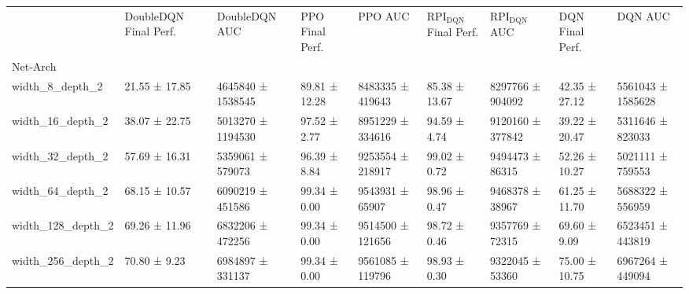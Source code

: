 \begin{tabular}{lllllllll}
\toprule
 & DoubleDQN Final Perf. & DoubleDQN AUC & PPO Final Perf. & PPO AUC & RPI$_{\mathrm{DQN}}$ Final Perf. & RPI$_{\mathrm{DQN}}$ AUC & DQN Final Perf. & DQN AUC \\
Net-Arch &  &  &  &  &  &  &  &  \\
\midrule
width_8_depth_2 & 21.55 ± 17.85 & 4645840 ± 1538545 & 89.81 ± 12.28 & 8483335 ± 419643 & 85.38 ± 13.67 & 8297766 ± 904092 & 42.35 ± 27.12 & 5561043 ± 1585628 \\
width_16_depth_2 & 38.07 ± 22.75 & 5013270 ± 1194530 & 97.52 ± 2.77 & 8951229 ± 334616 & 94.59 ± 4.74 & 9120160 ± 377842 & 39.22 ± 20.47 & 5311646 ± 823033 \\
width_32_depth_2 & 57.69 ± 16.31 & 5359061 ± 579073 & 96.39 ± 8.84 & 9253554 ± 218917 & 99.02 ± 0.72 & 9494473 ± 86315 & 52.26 ± 10.27 & 5021111 ± 759553 \\
width_64_depth_2 & 68.15 ± 10.57 & 6090219 ± 451586 & 99.34 ± 0.00 & 9543931 ± 65907 & 98.96 ± 0.47 & 9468378 ± 38967 & 61.25 ± 11.70 & 5688322 ± 556959 \\
width_128_depth_2 & 69.26 ± 11.96 & 6832206 ± 472256 & 99.34 ± 0.00 & 9514500 ± 121656 & 98.72 ± 0.46 & 9357769 ± 72315 & 69.60 ± 9.09 & 6523451 ± 443819 \\
width_256_depth_2 & 70.80 ± 9.23 & 6984897 ± 331137 & 99.34 ± 0.00 & 9561085 ± 119796 & 98.93 ± 0.30 & 9322045 ± 53360 & 75.00 ± 10.75 & 6967264 ± 449094 \\
\bottomrule
\end{tabular}
